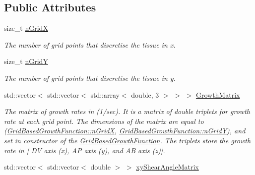 \subsection*{Public Attributes}
\begin{DoxyCompactItemize}
\item 
\hypertarget{classGridBasedGrowthFunction_a6d36f433ad29dd4f36352900d3795469}{}size\+\_\+t \hyperlink{classGridBasedGrowthFunction_a6d36f433ad29dd4f36352900d3795469}{n\+Grid\+X}\label{classGridBasedGrowthFunction_a6d36f433ad29dd4f36352900d3795469}

\begin{DoxyCompactList}\small\item\em The number of grid points that discretise the tissue in x. \end{DoxyCompactList}\item 
\hypertarget{classGridBasedGrowthFunction_ac992521b24e1975df1c7372c11285217}{}size\+\_\+t \hyperlink{classGridBasedGrowthFunction_ac992521b24e1975df1c7372c11285217}{n\+Grid\+Y}\label{classGridBasedGrowthFunction_ac992521b24e1975df1c7372c11285217}

\begin{DoxyCompactList}\small\item\em The number of grid points that discretise the tissue in y. \end{DoxyCompactList}\item 
\hypertarget{classGridBasedGrowthFunction_a4395f5fdec34cdbf0fa889e59811df81}{}std\+::vector$<$ std\+::vector$<$ std\+::array$<$ double, 3 $>$ $>$ $>$ \hyperlink{classGridBasedGrowthFunction_a4395f5fdec34cdbf0fa889e59811df81}{Growth\+Matrix}\label{classGridBasedGrowthFunction_a4395f5fdec34cdbf0fa889e59811df81}

\begin{DoxyCompactList}\small\item\em The matrix of growth rates in (1/sec). It is a matrix of double triplets for growth rate at each grid point. The dimensions of the matrix are equal to (\hyperlink{classGridBasedGrowthFunction_a6d36f433ad29dd4f36352900d3795469}{Grid\+Based\+Growth\+Function\+::n\+Grid\+X}, \hyperlink{classGridBasedGrowthFunction_ac992521b24e1975df1c7372c11285217}{Grid\+Based\+Growth\+Function\+::n\+Grid\+Y}), and set in constructor of the \hyperlink{classGridBasedGrowthFunction}{Grid\+Based\+Growth\+Function}. The triplets store the growth rate in \mbox{[} D\+V axis (x), A\+P axis (y), and A\+B axis (z)\mbox{]}. \end{DoxyCompactList}\item 
\hypertarget{classGridBasedGrowthFunction_a5b61c0acd9e8d8cd323f363bfb34c2c3}{}std\+::vector$<$ std\+::vector$<$ double $>$ $>$ \hyperlink{classGridBasedGrowthFunction_a5b61c0acd9e8d8cd323f363bfb34c2c3}{xy\+Shear\+Angle\+Matrix}\label{classGridBasedGrowthFunction_a5b61c0acd9e8d8cd323f363bfb34c2c3}


\end{DoxyCompactItemize}
